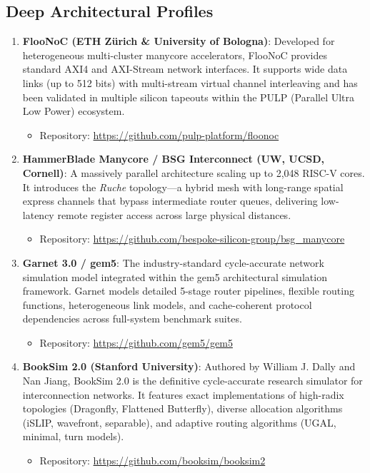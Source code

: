 \subsection{Deep Architectural Profiles}
\begin{enumerate}
    \item \textbf{FlooNoC (ETH Z{\"u}rich \& University of Bologna)}:
    Developed for heterogeneous multi-cluster manycore accelerators, FlooNoC provides standard AXI4 and AXI-Stream network interfaces. It supports wide data links (up to 512 bits) with multi-stream virtual channel interleaving and has been validated in multiple silicon tapeouts within the PULP (Parallel Ultra Low Power) ecosystem.
    \begin{itemize}
        \item Repository: \url{https://github.com/pulp-platform/floonoc}
    \end{itemize}

    \item \textbf{HammerBlade Manycore / BSG Interconnect (UW, UCSD, Cornell)}:
    A massively parallel architecture scaling up to 2,048 RISC-V cores. It introduces the \emph{Ruche} topology—a hybrid mesh with long-range spatial express channels that bypass intermediate router queues, delivering low-latency remote register access across large physical distances.
    \begin{itemize}
        \item Repository: \url{https://github.com/bespoke-silicon-group/bsg_manycore}
    \end{itemize}

    \item \textbf{Garnet 3.0 / gem5}:
    The industry-standard cycle-accurate network simulation model integrated within the gem5 architectural simulation framework. Garnet models detailed 5-stage router pipelines, flexible routing functions, heterogeneous link models, and cache-coherent protocol dependencies across full-system benchmark suites.
    \begin{itemize}
        \item Repository: \url{https://github.com/gem5/gem5}
    \end{itemize}

    \item \textbf{BookSim 2.0 (Stanford University)}:
    Authored by William J. Dally and Nan Jiang, BookSim 2.0 is the definitive cycle-accurate research simulator for interconnection networks. It features exact implementations of high-radix topologies (Dragonfly, Flattened Butterfly), diverse allocation algorithms (iSLIP, wavefront, separable), and adaptive routing algorithms (UGAL, minimal, turn models).
    \begin{itemize}
        \item Repository: \url{https://github.com/booksim/booksim2}
    \end{itemize}
\end{enumerate}

